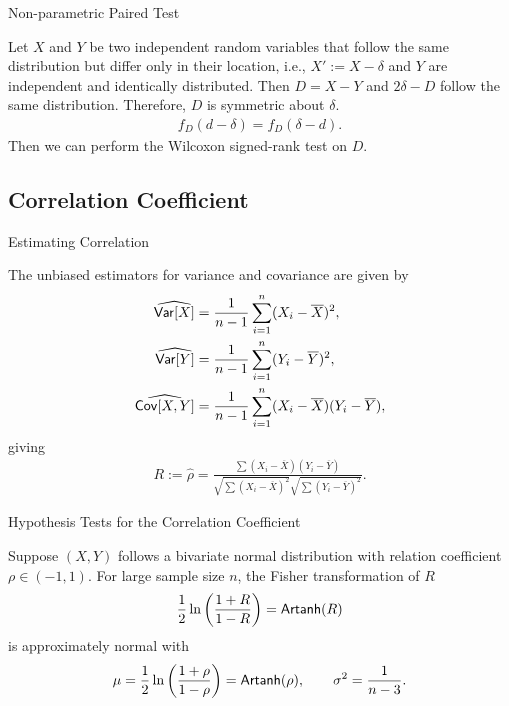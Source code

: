 \begin{frame}{Non-parametric Paired Test}

\justifying
{} Let $X$ and $Y$ be two independent random variables that follow the same distribution but differ only in their location, i.e., $X':=X-\delta$ and $Y$ are independent and identically distributed. Then $D = X - Y$ and $2\delta-D$ follow the same distribution. Therefore, $D$ is symmetric about $\delta$.
\begin{align*}
f_D(d-\delta) = f_D(\delta-d).
\end{align*}
Then we can perform the Wilcoxon signed-rank test on $D$.

\end{frame}


\subsection{Correlation Coefficient}

\begin{frame}{Estimating Correlation}

 The unbiased estimators for variance and covariance are given by
\begin{align*}
\widehat{\mathsf{Var}[X]} & = \frac{1}{n-1}\sum_{i=1}^n(X_i-\overline{X})^2, \\
\widehat{\mathsf{Var}[Y]} & = \frac{1}{n-1}\sum_{i=1}^n(Y_i-\overline{Y})^2, \\
\widehat{\mathsf{Cov}[X, Y]} & = \frac{1}{n-1} \sum_{i=1}^n (X_i-\overline{X})(Y_i-\overline{Y}),
\end{align*}
giving
\begin{align*}
R := \widehat{\rho} = \frac{\sum(X_i-\overline{X})(Y_i-\overline{Y})}{\sqrt{\sum(X_i-\overline{X})^2}\sqrt{\sum(Y_i-\overline{Y})^2}}.
\end{align*}

\end{frame}

\begin{frame}{Hypothesis Tests for the Correlation Coefficient}

\justifying
{} Suppose $(X, Y)$ follows a bivariate normal distribution with relation coefficient $\rho\in (-1, 1)$. For large sample size $n$, the Fisher transformation of $R$
\begin{align*}
\frac{1}{2}\ln\left(\frac{1+R}{1-R} \right) = \mathsf{Artanh}(R) 
\end{align*}
is approximately normal with
\begin{align*}
\mu = \frac{1}{2}\ln\left(\frac{1+\rho}{1-\rho} \right) = \mathsf{Artanh}(\rho), \qquad \sigma^2 = \frac{1}{n-3}.
\end{align*}

\end{frame}

